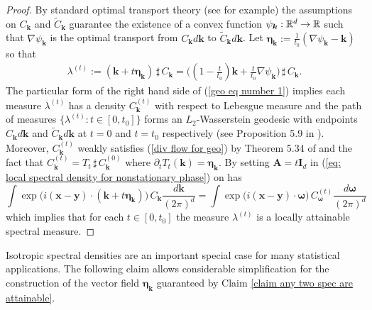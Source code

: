 \documentclass[10pt,noinfoline]{imsart}
\newcommand{\bs}{\boldsymbol}
\begin{document}
\begin{proof}
By standard optimal transport theory (see \cite{villani2003topics} for example) the assumptions on $C_{\bs k}$ and $\tilde C_{\bs k}$ guarantee the existence of a convex function $\psi_{\bs k}:\Bbb R^d \rightarrow \Bbb R$ such that $\nabla \psi_{\bs k}$ is the optimal transport from $C_{\bs k}d\bs k$ to $\tilde C_{\bs k}d\bs k$.  Let $\bs \eta_{\bs k}:= \frac{1}{t_0}(\nabla \psi_{\bs k}-\bs k)$ so that
\begin{align}
\label{geo eq number 1}
\lambda^{(t)}:=(\bs k + t\bs\eta_{\bs k})\,\sharp\, C_{\bs k} = \big((1-\textstyle\frac{t}{t_0})\bs k + \textstyle\frac{t}{t_0}\nabla\psi_{\bs k}\big)\,\sharp\, C_{\bs k}. 
\end{align}
The particular form of the right hand side of (\ref{geo eq number 1})  implies each measure $\lambda^{(t)}$ has a density $C_{\bs k}^{(t)}$ with respect to Lebesgue measure and the path of measures $\{\lambda^{(t)}\colon t\in[0,t_0] \}$ forms an $L_2$-Wasserstein geodesic with endpoints $C_{\bs k}d\bs k$ and $\tilde C_{\bs k}d\bs k$ at $t=0$ and $t=t_0$ respectively (see Proposition 5.9 in \cite{villani2003topics}). Moreover, $C^{(t)}_{\bs k}$ weakly satisfies (\ref{div flow for geo}) by Theorem 5.34 of \cite{villani2003topics} and the fact that $C^{(t)}_{\bs k} = T_t\,\sharp\, C^{(0)}_{\bs k}$ where $\partial_t T_t(\bs k) = \bs \eta_{\bs k}$.
By  setting $\bs A=t\bs I_d$ in (\ref{eq: local spectral density for nonstationary phase}) on has
\[
\int  \exp\!\big(i(\bs x-\bs y)\!\cdot\! (\bs k + t\bs\eta_{\bs k})\big)\, C_{\bs k}\frac{d\bs k}{(2\pi)^d} 
=\int \exp\!\big(i(\bs x-\bs y)\!\cdot\! \bs\omega\big)\,  C^{(t)}_{\bs \omega}\frac{d\bs \omega}{(2\pi)^d}
\]
which implies that for each $t\in[0,t_0]$ the measure $\lambda^{(t)}$ is a locally attainable spectral measure.
\end{proof}

Isotropic spectral densities are an important special case for many statistical applications. The following claim allows considerable simplification for the construction of the vector field $\bs \eta_{\bs k}$ guaranteed by Claim \ref{claim any two spec are attainable}.
\end{document}
